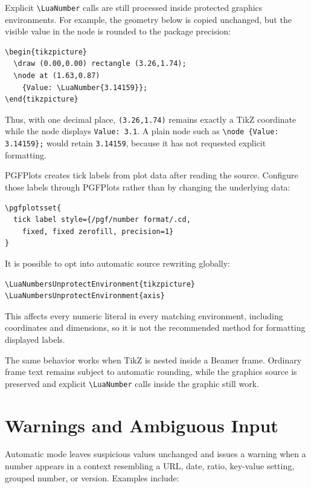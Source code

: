 \documentclass[11pt]{article}
\begin{document}
Explicit \verb|\LuaNumber| calls are still processed inside protected graphics
environments. For example, the geometry below is copied unchanged, but the
visible value in the node is rounded to the package precision:

\begin{lstlisting}[style=latexinput]
\begin{tikzpicture}
  \draw (0.00,0.00) rectangle (3.26,1.74);
  \node at (1.63,0.87)
    {Value: \LuaNumber{3.14159}};
\end{tikzpicture}
\end{lstlisting}

\LuaNumbersOff
Thus, with one decimal place, \texttt{(3.26,1.74)} remains exactly a TikZ
coordinate while the node displays \texttt{Value: 3.1}. A plain node such as
\verb|\node {Value: 3.14159};| would retain \texttt{3.14159}, because it has not
requested explicit formatting.
\LuaNumbersOn

PGFPlots creates tick labels from plot data after reading the source. Configure
those labels through PGFPlots rather than by changing the underlying data:

\begin{lstlisting}[style=latexinput]
\pgfplotsset{
  tick label style={/pgf/number format/.cd,
    fixed, fixed zerofill, precision=1}
}
\end{lstlisting}

It is possible to opt into automatic source rewriting globally:

\begin{lstlisting}[style=latexinput]
\LuaNumbersUnprotectEnvironment{tikzpicture}
\LuaNumbersUnprotectEnvironment{axis}
\end{lstlisting}

This affects every numeric literal in every matching environment, including
coordinates and dimensions, so it is not the recommended method for formatting
displayed labels.

The same behavior works when TikZ is nested inside a Beamer frame. Ordinary
frame text remains subject to automatic rounding, while the graphics source is
preserved and explicit \verb|\LuaNumber| calls inside the graphic still work.

\section{Warnings and Ambiguous Input}

Automatic mode leaves suspicious values unchanged and issues a warning when a
number appears in a context resembling a URL, date, ratio, key-value setting,
grouped number, or version. Examples include:
\end{document}
